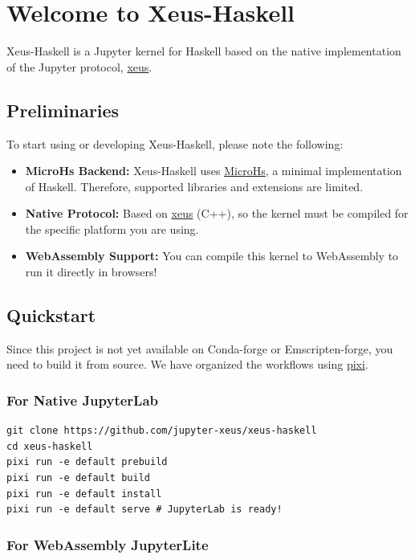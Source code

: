 \section{Welcome to Xeus-Haskell}


Xeus-Haskell is a Jupyter kernel for Haskell based on the native implementation of the Jupyter protocol, \href{https://github.com/jupyter-xeus/xeus}{xeus}.
\subsection{Preliminaries}


To start using or developing Xeus-Haskell, please note the following:
\begin{itemize}
\item \textbf{MicroHs Backend:} Xeus-Haskell uses \href{https://github.com/augustss/MicroHs}{MicroHs}, a minimal implementation of Haskell. Therefore, supported libraries and extensions are limited.
\item \textbf{Native Protocol:} Based on \href{https://github.com/jupyter-xeus/xeus}{xeus} (C++), so the kernel must be compiled for the specific platform you are using.
\item \textbf{WebAssembly Support:} You can compile this kernel to WebAssembly to run it directly in browsers!
\end{itemize}


\subsection{Quickstart}


Since this project is not yet available on Conda-forge or Emscripten-forge, you need to build it from source. We have organized the workflows using \href{https://pixi.sh}{pixi}.
\subsubsection{For Native JupyterLab}


\begin{verbatim}
git clone https://github.com/jupyter-xeus/xeus-haskell
cd xeus-haskell
pixi run -e default prebuild
pixi run -e default build
pixi run -e default install
pixi run -e default serve # JupyterLab is ready!
\end{verbatim}


\subsubsection{For WebAssembly JupyterLite}


